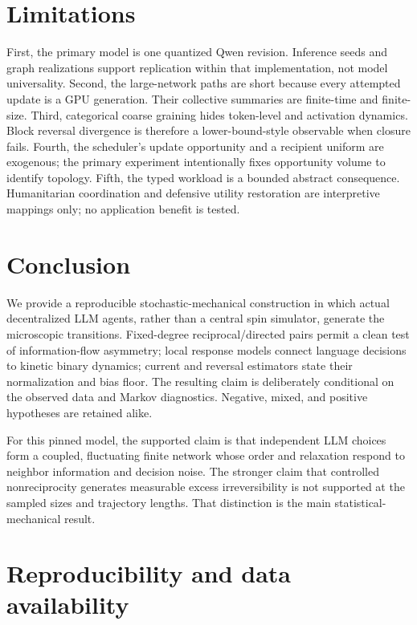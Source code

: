 \documentclass[12pt]{article}
\begin{document}
\section{Limitations}

First, the primary model is one quantized Qwen revision. Inference seeds and
graph realizations support replication within that implementation, not model
universality. Second, the large-network paths are short because every attempted
update is a GPU generation. Their collective summaries are finite-time and
finite-size. Third, categorical coarse graining hides token-level and activation
dynamics. Block reversal divergence is therefore a lower-bound-style observable
when closure fails. Fourth, the scheduler's update opportunity and a recipient
uniform are exogenous; the primary experiment intentionally fixes opportunity
volume to identify topology. Fifth, the typed workload is a bounded abstract
consequence. Humanitarian coordination and defensive utility restoration are
interpretive mappings only; no application benefit is tested.

\section{Conclusion}

We provide a reproducible stochastic-mechanical construction in which actual
decentralized LLM agents, rather than a central spin simulator, generate the
microscopic transitions. Fixed-degree reciprocal/directed pairs permit a clean
test of information-flow asymmetry; local response models connect language
decisions to kinetic binary dynamics; current and reversal estimators state
their normalization and bias floor. The resulting claim is deliberately
conditional on the observed data and Markov diagnostics. Negative, mixed, and
positive hypotheses are retained alike.

For this pinned model, the supported claim is that independent LLM choices form
a coupled, fluctuating finite network whose order and relaxation respond to
neighbor information and decision noise. The stronger claim that controlled
nonreciprocity generates measurable excess irreversibility is not supported at
the sampled sizes and trajectory lengths. That distinction is the main
statistical-mechanical result.

\section*{Reproducibility and data availability}
\end{document}
